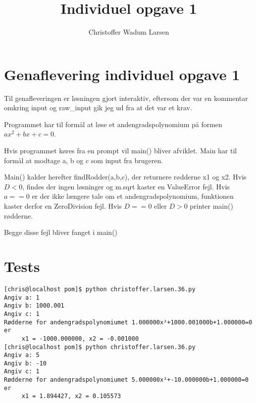 \documentclass[12pt]{article}
\title{Individuel opgave 1}
\author{Christoffer Wadum Larsen}
\begin{document}
\maketitle

\section{Genaflevering individuel opgave 1}

Til genafleveringen er løsningen gjort interaktiv, eftersom der var en kommentar omkring input og raw\_input gik jeg ud fra at det var et krav.

Programmet har til formål at løse et andengradspolynomium på formen $ax^2+bx+c=0$.

Hvis programmet køres fra en prompt vil main() bliver afviklet. Main har til formål at modtage a, b og c som input fra brugeren.

Main() kalder herefter findRodder(a,b,c), der returnere rødderne x1 og x2. Hvis $D < 0$, findes der ingen løsninger og m.sqrt kaster en ValueError fejl. Hvis $a == 0$ er der ikke længere tale om et andengradspolynomium, funktionen kaster derfor en ZeroDivision fejl. Hvis $D == 0$ eller $D > 0$ printer main() rødderne.

Begge disse fejl bliver fanget i main()


\section{Tests}

\begin{lstlisting}
[chris@localhost pom]$ python christoffer.larsen.36.py 
Angiv a: 1
Angiv b: 1000.001
Angiv c: 1
Rødderne for andengradspolynomiumet 1.000000x²+1000.001000b+1.000000=0 er 
	 x1 = -1000.000000, x2 = -0.001000
[chris@localhost pom]$ python christoffer.larsen.36.py 
Angiv a: 5
Angiv b: -10
Angiv c: 1
Rødderne for andengradspolynomiumet 5.000000x²+-10.000000b+1.000000=0 er 
	 x1 = 1.894427, x2 = 0.105573
\end{lstlisting}
\end{document}
